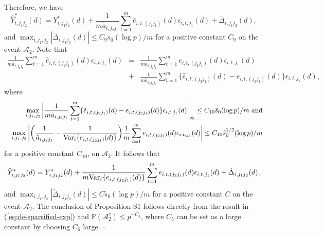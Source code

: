\documentclass[12pt]{article}
\numberwithin{equation}{section}
\def\be{\begin{equation}}
\def\ee{\end{equation}}
\def\bea{\begin{eqnarray}}
\def\eea{\end{eqnarray}}
\def\nn{\nonumber}
\newcommand{\V}{\rm Var}
\begin{document}
Therefore, we have
$$\hat{Y}_{i, j_1 j_2}^{\ast}(d) = Y_{i, j_1 j_2}^{\ast}(d) + \frac{1}{m \tilde{a}_{i, j_2j_1}}\sum_{t = 1}^{m} \hat{e}_{i, t, (j_2j_1)}(d)\epsilon_{i, t, j_1}(d)
+ \check{\Delta}_{i, j_1 j_2}(d),
$$
and $\max_{i, j_1, j_2}|\check{\Delta}_{i, j_1 j_2}(d)| \leq C_9 \tilde{s}_0 (\log p) / m $ for a positive constant $C_9$ on the event $\mathcal{A}_2$. 
Note that 
\bea
\frac{1}{m \tilde{a}_{i, j_2j_1}}\sum_{t = 1}^{m} \hat{e}_{i, t, (j_2j_1)}(d)\epsilon_{i, t, j_1}(d)
&=&
\frac{1}{m \tilde{a}_{i, j_2j_1}}\sum_{t = 1}^{m} e_{i, t, (j_2j_1)}(d)\epsilon_{i, t, j_1}(d) \nn \\
&+& \frac{1}{m \tilde{a}_{i, j_2j_1}}\sum_{t = 1}^{m} \{\hat{e}_{i, t, (j_2j_1)}(d) - e_{i, t, (j_2j_1)}(d)\}\epsilon_{i, t, j_1}(d),
\nn
\eea
where 
\bea
&& \max_{i, j_1, j_2}\bigg| \frac{1}{m \tilde{a}_{i, j_2j_1}}\sum_{t = 1}^{m} \{\hat{e}_{i, t, (j_2j_1)}(d) - e_{i, t, (j_2j_1)}(d)\}\epsilon_{i, t, j_1}(d) \bigg|_{\infty} \leq C_{10} \tilde{s}_0 (\log p) / m \ \mbox{and} \nn \\
&& \max_{i, j_1, j_2}\bigg| \bigg(\frac{1}{\tilde{a}_{i, j_2j_1}} - \frac{1}{{\V}_{i}\{e_{i, t, (j_2j_1)}(d)\}} \bigg) \frac{1}{m} \sum_{t = 1}^{m} e_{i, t, (j_2j_1)}(d)\epsilon_{i, t, j_1}(d) \bigg| \leq C_{10} \tilde{s}_0^{1/2} (\log p) / m
\nn
\eea
for a positive constant $C_{10}$, on $\mathcal{A}_2$.
It follows that
\be
\hat{Y}_{i, j_1 j_2}^{\ast}(d) = Y_{i, j_1 j_2}^{\ast}(d) + \frac{1}{m {\V}_{i}\{e_{i, t, (j_2j_1)}(d)\}}\sum_{t = 1}^{m} e_{i, t, (j_2j_1)}(d)\epsilon_{i, t, j_1}(d)
+ \tilde{\Delta}_{i, j_1 j_2}(d),
\label{eq:de-sparsified-exp}\ee
and $\max_{i, j_1, j_2}|\check{\Delta}_{i, j_1 j_2}(d)| \leq C \tilde{s}_0 (\log p) / m $ for a positive constant $C$ on the event $\mathcal{A}_2$. 
The conclusion of Proposition S1 follows directly from the result in (\ref{eq:de-sparsified-exp}) and $\mathbb{P}(\mathcal{A}_2^{c}) \leq p^{-C_5}$, where $C_5$ can be set as a large constant by choosing $C_6$ large. $\square$





\newpage
\end{document}

